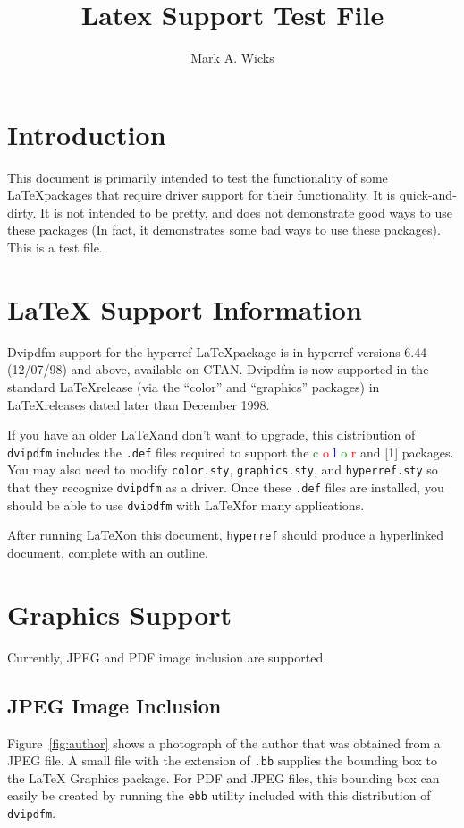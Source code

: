 \documentclass{article}
\title{\color{blue}Latex Support Test File}
\author{\color{green}Mark A. Wicks}
\begin{document}
\maketitle
\section{Introduction}
This document is primarily intended
to test the functionality
of some \LaTeX\space packages that require
driver support for their functionality.
It is quick-and-dirty.
It is not intended to be pretty, and
does not demonstrate good ways to use these packages
(In fact, it demonstrates some bad ways to use these packages).
This is a test file.

\section{LaTeX Support Information}
Dvipdfm support for the hyperref \LaTeX\space package is 
in hyperref versions 6.44 (12/07/98) and above, available on CTAN.
Dvipdfm is now supported in the
standard \LaTeX\space release (via the ``color'' and ``graphics'' packages) in
\LaTeX\space releases dated later than December 1998.

If you have an older LaTeX\space and don't want to upgrade,
this distribution of {\tt dvipdfm} includes
the {\tt .def} files required to support
the
\textcolor{green}{c}%
\textcolor{red}{o}%
\textcolor{blue}{l}%
\textcolor{green}{o}%
\textcolor{red}{r}
and
\scalebox{1.3}[1]{}
packages.
You may also need to modify {\tt color.sty}, {\tt graphics.sty},
and {\tt hyperref.sty} so that they
recognize {\tt dvipdfm} as a driver.
Once these {\tt .def} files are installed,
you should be able to use {\tt dvipdfm}
with \LaTeX\space for many applications.

After running \LaTeX\space on this
document, {\tt hyperref}
should produce a hyperlinked
document, complete with an outline.

\newpage
\section{Graphics Support}
Currently, JPEG and PDF image
inclusion are supported.

\subsection{JPEG Image Inclusion}
Figure~\ref{fig:author}
shows a photograph of the author
that was obtained from a JPEG file.
A small file with the extension of {\tt .bb}
supplies the bounding box to the \LaTeX\space
Graphics package.  For PDF and JPEG files,
this bounding box can easily be created by running
the {\tt ebb} utility included with this
distribution of {\tt dvipdfm}.
\end{document}
